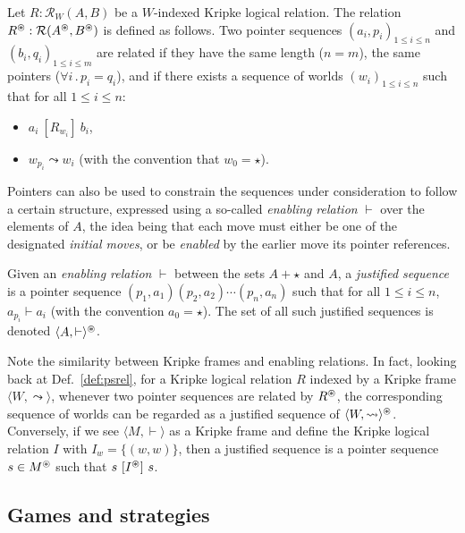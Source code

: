 \documentclass[acmsmall,anonymous]{acmart}
\newcommand{\ifr}[1]{\ [{#1}]\ }
\begin{document}
\begin{definition}
\label{def:psrel}
Let $R : \mathcal{R}_W(A, B)$
be a $W$-indexed Kripke logical relation.
The relation $R^\oast : \mathcal{R}(A^\oast, B^\oast)$
is defined as follows.
Two pointer sequences
$(a_i, p_i)_{1 \le i \le n}$ and
$(b_i, q_i)_{1 \le i \le m}$
are related if they have the same length ($n = m$),
the same pointers ($\forall i \,.\, p_i = q_i$),
and if there exists a sequence of worlds $(w_i)_{1 \le i \le n}$
such that for all $1 \le i \le n$:
\begin{itemize}
\item $a_i \ifr{R_{w_i}} b_i$,
\item $w_{p_i} \leadsto w_i$ (with the convention that $w_0 = \star$).
\end{itemize}
\end{definition}

Pointers can also be used to constrain the sequences under consideration
to follow a certain structure,
expressed using a so-called \emph{enabling relation} $\vdash$
over the elements of $A$,
the idea being that each move must either be
one of the designated \emph{initial moves},
or be \emph{enabled} by the earlier move its pointer references.

\begin{definition}
Given an \emph{enabling relation} $\vdash$ between the sets
$A + {\star}$ and $A$,
a \emph{justified sequence} is
a pointer sequence $(p_1, a_1) (p_2, a_2) \cdots (p_n, a_n)$
such that for all $1 \le i \le n$,
$a_{p_i} \vdash a_i$
(with the convention $a_0 = \star$).
The set of all such justified sequences
is denoted $\langle A, \vdash \rangle^\oast$.
\end{definition}

Note the similarity between Kripke frames and enabling relations.
In fact, looking back at Def.~\ref{def:psrel},
for a Kripke logical relation $R$ indexed by
a Kripke frame $\langle W, \leadsto \rangle$,
whenever two pointer sequences are related by $R^\oast$,
the corresponding sequence of worlds
can be regarded as a justified sequence of
$\langle W, \leadsto \rangle^\oast$.
Conversely,
if we see $\langle M, \vdash \rangle$ as a Kripke frame
and define the Kripke logical relation $I$
with $I_w = \{(w, w)\}$, then
a justified sequence is a pointer sequence $s \in M^\oast$
such that $s \ifr{I^\oast} s$.


\subsection{Games and strategies} %
\end{document}
